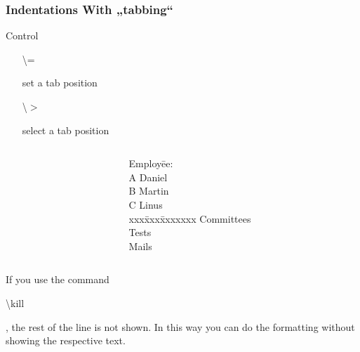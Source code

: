 \begin{frame}
\frametitle{Indentations With „tabbing“}
\begin{block}{Control}
\begin{itemize}
\item[\begin{ttfamily}\color{nounibaredI}\textbackslash =\end{ttfamily}]\color{black}set a tab position 
\item[\begin{ttfamily}\color{nounibaredI}\textbackslash $>$\end{ttfamily}]select a tab position
\end{itemize}
\end{block}

\begin{columns}
\begin{column}{.5\textwidth}
\begin{ttfamily}{\scriptsize
}
\end{ttfamily}
\end{column}
\begin{column}{.5\textwidth}
\begin{tabbing}
Employ\=ee:\\
A  \> Daniel\\
B  \> Martin\\
C  \> Linus\\
xxx\=xxx\=xxxxxxx\kill
\> Committees\\
\>\> Tests\\
\>\> Mails\\
\end{tabbing}
\end{column}
\end{columns}

If you use the command \begin{ttfamily}\color{nounibaredI}\textbackslash kill\color{black}\end{ttfamily}, the rest of the line is not shown. In this way you can do the formatting without showing the respective text.
\end{frame}
